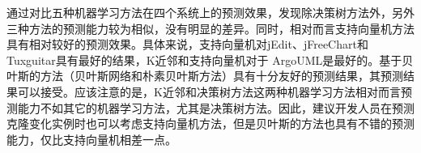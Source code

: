 通过对比五种机器学习方法在四个系统上的预测效果，发现除决策树方法外，另外三种方法的预测能力较为相似，没有明显的差异。同时，相对而言支持向量机方法具有相对较好的预测效果。具体来说，支持向量机对jEdit、jFreeChart和Tuxguitar具有最好的结果，K近邻和支持向量机对于 ArgoUML是最好的。基于贝叶斯的方法（贝叶斯网络和朴素贝叶斯方法）具有十分友好的预测结果，其预测结果可以接受。应该注意的是，K近邻和决策树方法这两种机器学习方法相对而言预测能力不如其它的机器学习方法，尤其是决策树方法。因此，建议开发人员在预测克隆变化实例时也可以考虑支持向量机方法，但是贝叶斯的方法也具有不错的预测能力，仅比支持向量机相差一点。

%
%
